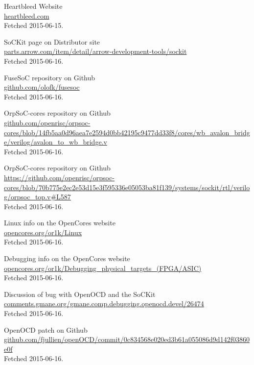 \documentclass[11pt,a4paper,twoside,openany]{report}
\begin{document}
\begin{thebibliography}{9}

  Heartbleed Website\\
  \url{heartbleed.com}\\
  Fetched 2015-06-15.
  
  SoCKit page on Distributor site\\
  \url{parts.arrow.com/item/detail/arrow-development-tools/sockit}\\
  Fetched 2015-06-16.
  
  FuseSoC repository on Github\\
  \url{github.com/olofk/fusesoc}\\
  Fetched 2015-06-16.
  
	OrpSoC-cores repository on Github\\
	\url{github.com/openrisc/orpsoc-cores/blob/14fb5aa0d96aea7e2594d0bb42195c9477dd33f8/cores/wb_avalon_bridge/verilog/avalon_to_wb_bridge.v} \\
	Fetched 2015-06-16.
	  
	OrpSoC-cores repository on Github\\
	\url{https://github.com/openrisc/orpsoc-cores/blob/70b775e2ec2e53d15e3f595336e05053ba81f139/systems/sockit/rtl/verilog/orpsoc_top.v#L587} \\
	Fetched 2015-06-16.
	
	Linux info on the OpenCores website\\
	\url{opencores.org/or1k/Linux}\\
	Fetched 2015-06-16.
	
	Debugging info on the OpenCores website\\
	\url{opencores.org/or1k/Debugging_physical_targets_(FPGA/ASIC)}\\
	Fetched 2015-06-16.
	
	Discussion of bug with OpenOCD and the SoCKit\\
	\url{comments.gmane.org/gmane.comp.debugging.openocd.devel/26474}\\
	Fetched 2015-06-16.
	
	OpenOCD patch on Github\\
	\url{github.com/fjullien/openOCD/commit/0c834568e020ed3b61a055086d9d142f03860e0f}\\
	Fetched 2015-06-16.

\end{thebibliography}
\end{document}
